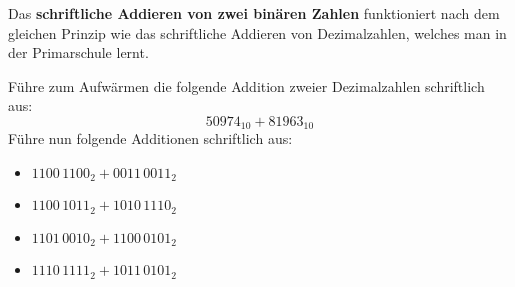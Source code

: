 \begin{question}
	Das \textbf{schriftliche Addieren von zwei binären Zahlen} funktioniert nach dem gleichen Prinzip wie das schriftliche Addieren von Dezimalzahlen, welches man in der Primarschule lernt.
	\begin{tasks}
		\task Führe zum Aufwärmen die folgende Addition zweier Dezimalzahlen schriftlich aus:
		$$\num{50974}_{10} + \num{81963}_{10}$$
		\task Führe nun folgende Additionen schriftlich aus:
		\begin{itemize}
			\item $1100\,1100_2 + 0011\,0011_2$
			\item $1100\,1011_2 + 1010\,1110_2$
			\item $1101\,0010_2 + 1100\,0101_2$
			\item $1110\,1111_2 + 1011\,0101_2$
		\end{itemize}
	\end{tasks}
\end{question}
